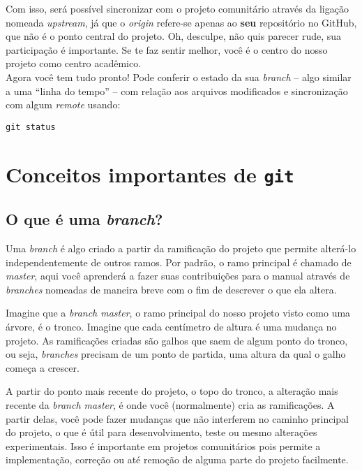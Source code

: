\documentclass[a4paper,oneside,10pt]{memoir}
\begin{document}
Com isso, será possível sincronizar com o projeto comunitário através da
ligação nomeada \emph{upstream}, já que o \emph{origin} refere-se apenas ao
\textbf{seu} repositório no GitHub, que não é o ponto central do projeto. Oh,
desculpe, não quis parecer rude, sua participação é importante. Se te faz
sentir melhor, você é o centro do nosso projeto como centro acadêmico.
\\

Agora você tem tudo pronto! Pode conferir o estado da sua \emph{branch} --
algo similar a uma ``linha do tempo'' -- com relação aos arquivos modificados
e sincronização com algum \emph{remote} usando:

\begin{center}
\texttt{git status}
\end{center}

\section{Conceitos importantes de \texttt{git}}

\subsection{O que é uma \emph{branch}?}

Uma \emph{branch} é algo criado a partir da ramificação do projeto que permite
alterá-lo independentemente de outros ramos. Por padrão, o ramo principal é
chamado de \emph{master}, aqui você aprenderá a fazer suas contribuições para o
manual através de \emph{branches} nomeadas de maneira breve com o fim de
descrever o que ela altera.

Imagine que a \emph{branch master}, o ramo principal do nosso projeto visto
como uma árvore, é o tronco. Imagine que cada centímetro de altura é uma
mudança no projeto. As ramificações criadas são galhos que saem de algum ponto
do tronco, ou seja, \emph{branches} precisam de um ponto de partida, uma altura
da qual o galho começa a crescer.

A partir do ponto mais recente do projeto, o topo do tronco, a alteração mais
recente da \emph{branch master}, é onde você (normalmente) cria as ramificações.
A partir delas, você pode fazer mudanças que não interferem no caminho principal
do projeto, o que é útil para desenvolvimento, teste ou mesmo alterações
experimentais. Isso é importante em projetos comunitários pois permite a
implementação, correção ou até remoção de alguma parte do projeto facilmente.
\end{document}
